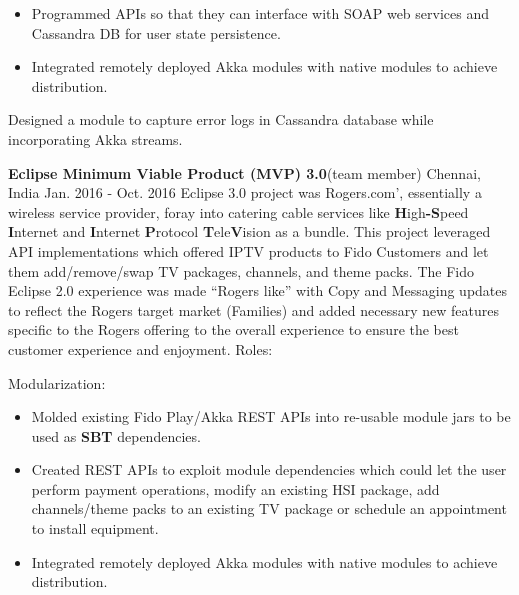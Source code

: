 \begin{cventries}
{\begin{cvitems}
\begin{itemize}
\item Programmed APIs so that they can interface with SOAP web services and Cassandra DB for user state persistence.
\end{itemize}
\begin{itemize}
\item Integrated remotely deployed Akka modules with native modules to achieve distribution. 
\end{itemize}
        \item {Designed a module to capture error logs in Cassandra database while incorporating Akka streams.}
             \end{cvitems}
    }
 \experienceentry
    {\textbf{Eclipse Minimum Viable Product (MVP) 3.0}(team member)}
    {}
    {Chennai, India}
    {Jan. 2016 - Oct. 2016}
    {Eclipse 3.0 project was Rogers.com', essentially a wireless service provider, foray into catering cable services like \textbf{H}igh\textbf{-}\textbf{S}peed \textbf{I}nternet and \textbf{I}nternet \textbf{P}rotocol \textbf{T}ele\textbf{V}ision as a bundle. This project leveraged API implementations which offered IPTV products to Fido Customers and let them add/remove/swap TV packages, channels, and theme packs. The Fido Eclipse 2.0 experience was made “Rogers like” with Copy and Messaging updates to reflect the Rogers target market (Families) and added necessary new features specific to the Rogers offering to the overall experience to ensure the best customer experience and enjoyment.
}
    {Roles:}
    {
      \begin{cvitems}
        \item {Modularization:}
        \begin{itemize}
\item Molded existing Fido Play/Akka REST APIs into re-usable module jars to be used as \textbf{SBT} dependencies.
\end{itemize}
\begin{itemize}
\item Created REST APIs to exploit module dependencies which could let the user perform payment operations, modify an existing HSI package, add channels/theme packs to an existing TV package or schedule an appointment to install equipment.
\end{itemize}
\begin{itemize}
\item Integrated remotely deployed Akka modules with native modules to achieve distribution. 
\end{itemize}

\end{cvitems}}
\end{cventries}

